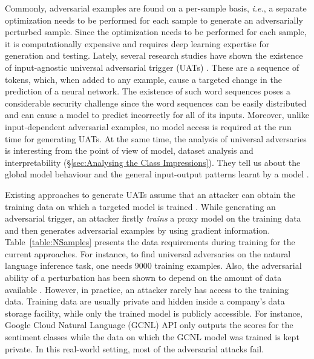 Commonly, adversarial examples are found on a per-sample basis, \textit{i.e.}, a separate optimization needs to be performed for each sample to generate an adversarially perturbed sample. Since the optimization needs to be performed for each sample, it is computationally expensive and requires deep learning expertise for generation and testing. Lately, several research studies have shown the existence of input-agnostic universal adversarial trigger (UATs) \cite{moosavi2017universal,wallace2019universal}. These are a sequence of tokens, which, when added to any example, cause a targeted change in the prediction of a neural network. The existence of such word sequences poses a considerable security challenge since the word sequences can be easily distributed and can cause a model to predict incorrectly for all of its inputs. Moreover, unlike input-dependent adversarial examples, no model access is required at the run time for generating UATs. At the same time, the analysis of universal adversaries is interesting from the point of view of model, dataset analysis and interpretability (\S\ref{sec:Analysing the Class Impressions}). They tell us about the global model behaviour and the general input-output patterns learnt by a model \cite{wallace2019universal}.


Existing approaches to generate UATs assume that an attacker can obtain the training data on which a targeted model is trained \cite{wallace2019universal,behjati2019universal}. While generating an adversarial trigger, an attacker firstly \textit{trains} a proxy model on the training data and then generates adversarial examples by using gradient information. Table~\ref{table:NSamples} presents the data requirements during training for the current approaches. For instance, to find universal adversaries on the natural language inference task, one needs 9000 training examples. Also, the adversarial ability of a perturbation has been shown to depend on the amount of data available \cite{mopuri2017fast,mopuri2018generalizable}. However, in practice, an attacker rarely has access to the training data. Training data are usually private and hidden inside a company's data storage facility, while only the trained model is publicly accessible. For instance, Google Cloud Natural Language (GCNL) API only outputs the scores for the sentiment classes \cite{gcnlAPI} while the data on which the GCNL model was trained is kept private. In this real-world setting, most of the adversarial attacks fail.

